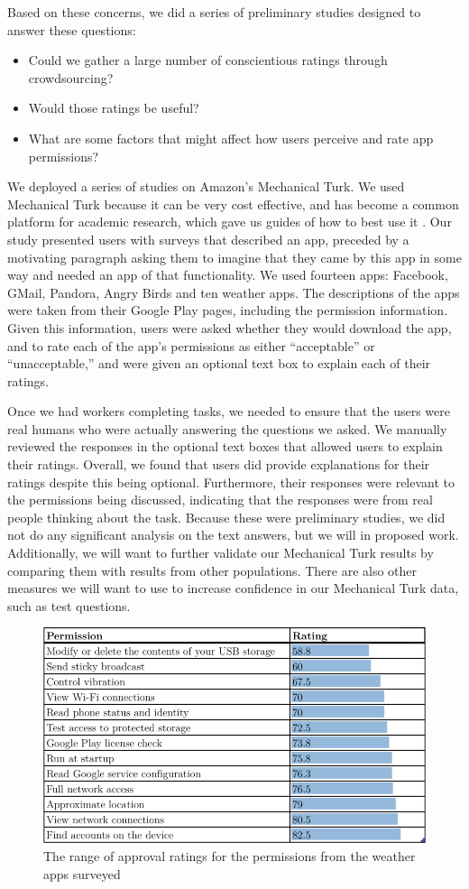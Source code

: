 \documentclass[11pt]{article}
\begin{document}
Based on these concerns, we did a series of preliminary studies designed to answer
these questions:
\begin{itemize}
\item Could we gather a large number of conscientious ratings through crowdsourcing?
\item Would those ratings be useful?
\item What are some factors that might affect how users perceive and rate 
app permissions?
\end{itemize}
We deployed a series of studies on Amazon's Mechanical Turk. We used
Mechanical Turk because it can be very cost effective, and has become
a common platform for academic research, which gave us guides of how
to best use it \cite{reseach-mturk-BRM12, mturk-data-quality-PPS11}. 
Our study presented users with surveys that
described an app, preceded by a motivating paragraph asking
them to imagine that they came by this app in some way and needed an
app of that functionality.  We used fourteen apps: Facebook, GMail,
Pandora, Angry Birds and ten weather apps.  The descriptions
of the apps were taken from their Google Play pages, including the
permission information. Given this information, users were asked
whether they would download the app, and to rate each of the app's
permissions as either ``acceptable'' or ``unacceptable,'' and were
given an optional text box to explain each of their ratings.

Once we had workers completing tasks, we needed to ensure that the
users were real humans who were actually answering the questions we
asked. We manually reviewed the responses in the optional text boxes
that allowed users to explain their ratings. Overall, we found that
users did provide explanations for their ratings despite this being
optional. Furthermore, their responses were relevant to the
permissions being discussed, indicating that the responses were from
real people thinking about the task. Because these were preliminary
studies, we did not do any significant analysis on the text answers,
but we will in proposed work. Additionally, we will want to further
validate our Mechanical Turk results by comparing them with results
from other populations. There are also other measures we will want to
use to increase confidence in our Mechanical Turk data, such as test
questions.

\begin{figure}[t]
\centering
    \includegraphics[width=.6\linewidth]{img/RatingTable.png}
    \vspace{1pt}
    \caption{The range of approval ratings for the permissions from the 
    weather apps surveyed}
    \label{weatherratings}
\end{figure}
\end{document}
